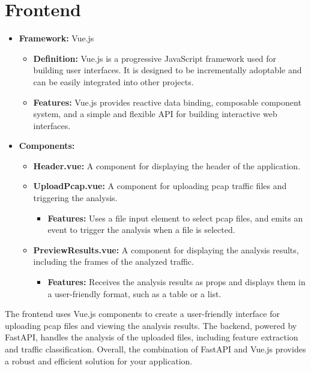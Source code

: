 \section{Frontend}
\begin{itemize}
	\item \textbf{Framework:} Vue.js
	\begin{itemize}
		\item \textbf{Definition:} Vue.js is a progressive JavaScript framework used for building user interfaces. It is designed to be incrementally adoptable and can be easily integrated into other projects.
		\item \textbf{Features:} Vue.js provides reactive data binding, composable component system, and a simple and flexible API for building interactive web interfaces.
	\end{itemize}
	\item \textbf{Components:}
	\begin{itemize}
		\item \textbf{Header.vue:} A component for displaying the header of the application.
		\item \textbf{UploadPcap.vue:} A component for uploading pcap traffic files and triggering the analysis.
		\begin{itemize}
			\item \textbf{Features:} Uses a file input element to select pcap files, and emits an event to trigger the analysis when a file is selected.
		\end{itemize}
		\item \textbf{PreviewResults.vue:} A component for displaying the analysis results, including the frames of the analyzed traffic.
		\begin{itemize}
			\item \textbf{Features:} Receives the analysis results as props and displays them in a user-friendly format, such as a table or a list.
		\end{itemize}
	\end{itemize}
\end{itemize}

The frontend uses Vue.js components to create a user-friendly interface for uploading pcap files and viewing the analysis results. The backend, powered by FastAPI, handles the analysis of the uploaded files, including feature extraction and traffic classification. Overall, the combination of FastAPI and Vue.js provides a robust and efficient solution for your application.


